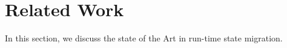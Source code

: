 \chapter{Related Work}
In this section, we discuss the state of the Art in run-time state migration.
\label{ch:related}

